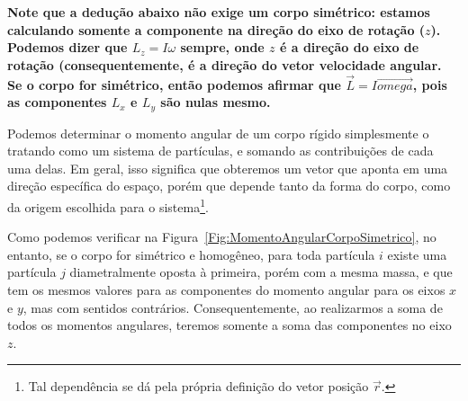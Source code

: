 \textbf{Note que a dedução abaixo não exige um corpo simétrico: estamos calculando somente a componente na direção do eixo de rotação ($z$). Podemos dizer que $L_z = I\omega$ sempre, onde $z$ é a direção do eixo de rotação (consequentemente, é a direção do vetor velocidade angular. Se o corpo for simétrico, então podemos afirmar que $\vec{L} = I\vec{omega}$, pois as componentes $L_x$ e $L_y$ são nulas mesmo.}

Podemos determinar o momento angular de um corpo rígido simplesmente o tratando como um sistema de partículas, e somando as contribuições de cada uma delas. Em geral, isso significa que obteremos um vetor que aponta em uma direção específica do espaço, porém que depende tanto da forma do corpo, como da origem escolhida para o sistema\footnote{Tal dependência se dá pela própria definição do vetor posição $\vec{r}$.}.

Como podemos verificar na Figura~\ref{Fig:MomentoAngularCorpoSimetrico}, no entanto, se o corpo for simétrico e homogêneo, para toda partícula $i$ existe uma partícula $j$ diametralmente oposta à primeira, porém com a mesma massa, e que tem os mesmos valores para as componentes do momento angular para os eixos $x$ e $y$, mas com sentidos contrários. Consequentemente, ao realizarmos a soma de todos os momentos angulares, teremos somente a soma das componentes no eixo $z$.

